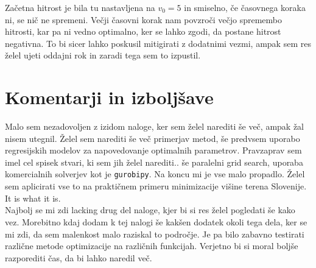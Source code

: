 \documentclass[a4paper]{article}
\begin{document}
Začetna hitrost je bila tu nastavljena na $v_0 = 5$ in smiselno, če časovnega koraka ni, se nič ne spremeni. Večji 
časovni korak nam povzroči večjo spremembo hitrosti, kar pa ni vedno optimalno, ker se lahko zgodi, da postane 
hitrost negativna. To bi sicer lahko poskusil mitigirati z dodatnimi vezmi, ampak sem res želel ujeti oddajni rok in
zaradi tega sem to izpustil.

\section{Komentarji in izboljšave}
Malo sem nezadovoljen z izidom naloge, ker sem želel narediti še več, ampak žal nisem utegnil. Želel sem narediti
še več primerjav metod, še predvsem uporabo regresijskih modelov za napovedovanje optimalnih parametrov. Pravzaprav 
sem imel cel spisek stvari, ki sem jih želel narediti.. še paralelni grid search, uporaba komercialnih solverjev kot
je \texttt{gurobipy}. Na koncu mi je vse malo propadlo. Želel sem aplicirati vse to na praktičnem primeru minimizacije
višine terena Slovenije. It is what it is. \\

Najbolj se mi zdi lacking drug del naloge, kjer bi si res želel pogledati še kako vez. Morebitno kdaj dodam k tej 
nalogi še kakšen dodatek okoli tega dela, ker se mi zdi, da sem malenkost malo raziskal to področje. Je pa bilo zabavno
testirati različne metode optimizacije na različnih funkcijah. Verjetno bi si moral boljše razporediti čas, da bi lahko
naredil več. \\

\newpage


\end{document}
